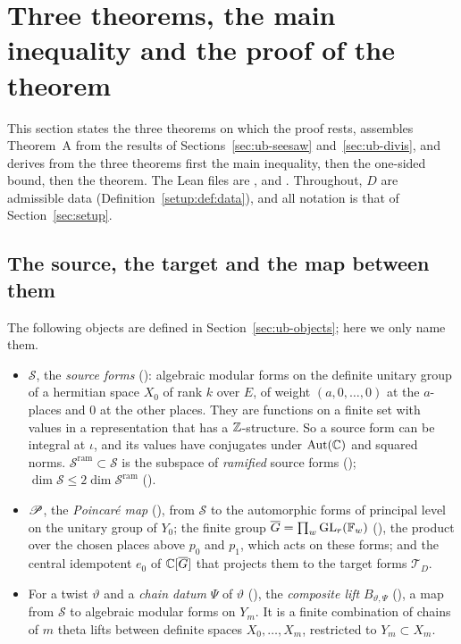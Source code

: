 \section{Three theorems, the main inequality and the proof of the theorem}\label{sec:main}

This section states the three theorems on which the proof rests, assembles Theorem~A from the
results of Sections~\ref{sec:ub-seesaw} and~\ref{sec:ub-divis}, and derives from the three
theorems first the main inequality, then the one-sided bound, then the theorem. The Lean files are
,  and
. Throughout, $D$ are admissible data
(Definition~\ref{setup:def:data}), and all notation is that of Section~\ref{sec:setup}.

\subsection{The source, the target and the map between them}

The following objects are defined in Section~\ref{sec:ub-objects}; here we only name them.
\begin{itemize}
\item $\mathcal{S}$, the \emph{source forms} (): algebraic modular forms
  on the definite unitary group of a hermitian space $X_0$ of rank $k$ over $E$, of weight
  $(a, 0, \dots, 0)$ at the $a$-places and $0$ at the other places. They are functions on a finite
  set with values in a representation that has a $\mathbb{Z}$-structure. So a source form can be integral
  at $\iota$, and its values have conjugates under $\operatorname{Aut}(\mathbb{C})$ and squared norms.
  $\mathcal{S}^{\mathrm{ram}} \subset \mathcal{S}$ is the subspace of \emph{ramified} source forms
  (); $\dim\mathcal{S} \le 2\dim\mathcal{S}^{\mathrm{ram}}$
  ().
\item $\mathscr{P}$, the \emph{Poincar\'e map} (), from $\mathcal{S}$ to the
  automorphic forms of principal level on the unitary group of $Y_0$; the finite group
  $\overline{G} = \prod_w \operatorname{GL}_r(\mathbb{F}_w)$ (), the product over the chosen places
  above $p_0$ and $p_1$, which acts on these forms; and the central idempotent $e_0$ of
  $\mathbb{C}[\overline{G}]$ that projects them to the target forms $\mathcal{T}_D$.
\item For a twist $\vartheta$ and a \emph{chain datum} $\Psi$ of $\vartheta$
  (), the \emph{composite lift}
  $B_{\vartheta,\Psi}$ (), a map from $\mathcal{S}$ to algebraic
  modular forms on $Y_m$. It is a finite combination of chains of $m$ theta lifts between definite
  spaces $X_0, \dots, X_m$, restricted to $Y_m \subset X_m$.
\end{itemize}

